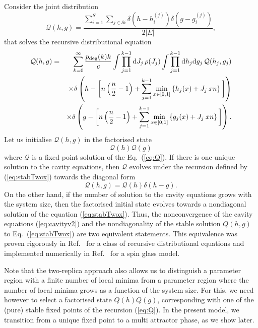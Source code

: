 \documentclass[11pt,a4paper]{article}
\begin{document}
Consider the  joint distribution 
\begin{equation}
\mathcal{Q}(h,g) = \frac{\sum^S_{i=1}\sum_{j\in \partial i}\delta(h-h^{(j)}_i)\delta(g-g^{(j)}_i)}{ 2|E|}, 
\end{equation}  
that 
solves  the recursive distributional equation 
\begin{eqnarray}
    \mathcal{Q}(h,g) &=& \sum^{\infty}_{k=0} \frac{p_{\rm deg}(k)k}{c} \int \prod^{k-1}_{j=1} \mathrm{d} J_j \, \rho(J_j) \int \prod^{k-1}_{j=1} \mathrm{d}h_j{\rm d}g_j \, \mathcal{Q}(h_j,g_j)
    \nonumber\\
    && \times
    \delta\left(h - \bigg[n\left(\frac{n}{2}-1\right) + \sum^{k-1}_{j=1}\min_{x \in [0,1]} \left\{h_j(x)+J_{j}\: x n\right\} \bigg]\right)
    \nonumber\\
    && \times
    \delta\left(g - \bigg[n\left(\frac{n}{2}-1\right) + \sum^{k-1}_{j=1}\min_{x\in [0,1]} \left\{g_j(x)+J_{j}\: xn\right\} \bigg] \right).  
    \label{eq:stabTwox}
\end{eqnarray}
Let us initialise $   \mathcal{Q}(h,g) $ in the factorised state  
\begin{equation}
    \mathcal{Q}(h)\mathcal{Q}(g) 
\end{equation} 
where $ \mathcal{Q}$ is a fixed point solution of the Eq.~(\ref{eq:Q}).  If there is  one  unique solution to the   cavity equations, then  $ \mathcal{Q}$  
evolves under the recursion defined by (\ref{eq:stabTwox}) towards the diagonal form 
\begin{equation}
    \mathcal{Q}(h,g) = \mathcal{Q}(h)\delta(h-g).  \label{diag}
\end{equation}  
On the other hand, if the number of solution to the cavity equations grows with the system size, then the  factorised initial state evolves towards a nondiagonal  solution of the equation (\ref{eq:stabTwox}). 
Thus, the nonconvergence of the cavity equations (\ref{eq:cavityv2})   and the   nondiagonality of the stable  solution $Q(h,g)$ to    Eq.~(\ref{eq:stabTwox}) are two equivalent statements.   This equivalence was proven rigorously in Ref.~\cite{aldous2005survey} for a class of recursive distributional equations and implemented numerically in Ref.~\cite{neri2010phase}  for a spin glass model. 
 
Note that  the two-replica approach also allows us to distinguish a parameter region with a finite number of local minima  from a parameter region where the number of local minima grows as a function of the system size.   For this, we need however to select a  factorised state $Q(h)Q(g)$, corresponding with one of the (pure) stable fixed points of the recursion (\ref{eq:Q}).    In the present model, we transition from a unique fixed point to a multi attractor phase, as we show later. 
  
\end{document}
